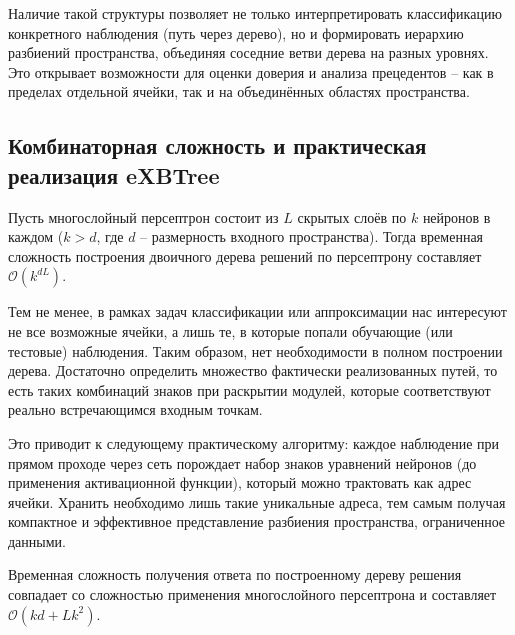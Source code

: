Наличие такой структуры позволяет не только интерпретировать классификацию конкретного наблюдения (путь через дерево), но и формировать иерархию разбиений пространства, объединяя соседние ветви дерева на разных уровнях. Это открывает возможности для оценки доверия и анализа прецедентов -- как в пределах отдельной ячейки, так и на объединённых областях пространства.

\subsection{Комбинаторная сложность и практическая реализация eXBTree}

\begin{theorem}
    Пусть многослойный персептрон состоит из \(L\) скрытых слоёв по \(k\) нейронов в каждом (\(k > d\), где \(d\) -- размерность входного пространства). Тогда временная сложность построения двоичного дерева решений по персептрону составляет \(\mathcal{O}(k^{dL})\).
\end{theorem}

Тем не менее, в рамках задач классификации или аппроксимации нас интересуют не все возможные ячейки, а лишь те, в которые попали обучающие (или тестовые) наблюдения. Таким образом, нет необходимости в полном построении дерева. Достаточно определить множество фактически реализованных путей, то есть таких комбинаций знаков при раскрытии модулей, которые соответствуют реально встречающимся входным точкам.

Это приводит к следующему практическому алгоритму: каждое наблюдение при прямом проходе через сеть порождает набор знаков уравнений нейронов (до применения активационной функции), который можно трактовать как адрес ячейки. Хранить необходимо лишь такие уникальные адреса, тем самым получая компактное и эффективное представление разбиения пространства, ограниченное данными.

\begin{theorem}
    Временная сложность получения ответа по построенному дереву решения совпадает со сложностью применения многослойного персептрона и составляет \(\mathcal{O}(kd + Lk^2)\).
\end{theorem}

